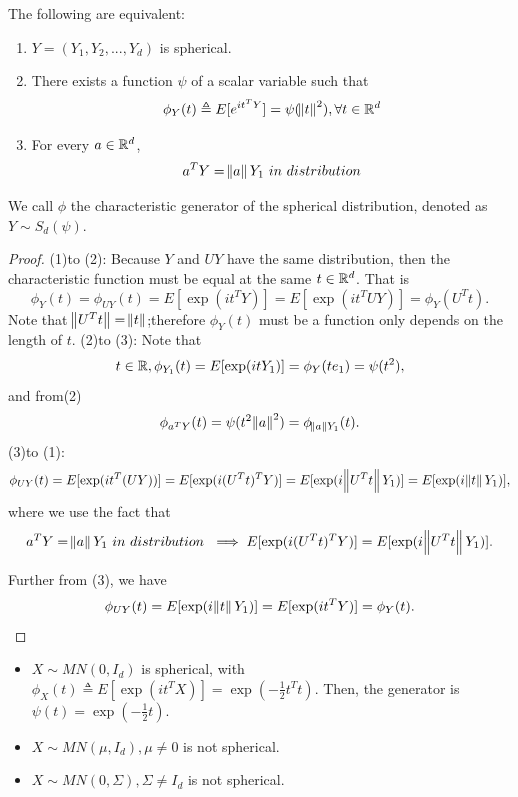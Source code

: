 \begin{refsection}
\begin{lemma}\cite[89]{mcneil2015quantitative}
	The following are equivalent:
	\begin{enumerate}
		\item $Y = (Y_1,Y_2,...,Y_d)$ is spherical.
		\item There exists a function $\psi$ of a scalar variable such that
		$$\phi_{Y}(t) \triangleq E[e^{it^TY}] = \psi(\norm{t}^2),\forall t\in \mathbb{R}^d$$
		\item For every $a\in \mathbb{R}^d$, 
		$$a^TY = \norm{a}Y_1 ~in~distribution$$
	\end{enumerate}
	We call $\phi$ the characteristic generator of the spherical distribution, denoted as $Y\sim S_d(\psi)$.
\end{lemma}
\begin{proof}
	(1)to (2): Because $Y$ and $UY$ have the same distribution, then the characteristic function must be equal at the same $t\in \mathbb{R}^d$. That is
	$$\phi_Y(t) = \phi_{UY}(t) = E[\exp(i t^TY)] = E[\exp(i t^TUY)]=\phi_Y(U^Tt).$$
	Note that $\norm{U^Tt} = \norm{t}$;therefore $\phi_Y(t)$ must be a function only depends on the length of $t$. 
	(2)to (3): Note that$$t\in \mathbb{R},\phi_{Y_1}(t) = E[\exp(itY_1)] = \phi_Y(te_1)= \psi(t^2),$$
	and from(2)
	$$\phi_{a^TY}(t) = \psi(t^2\norm{a}^2) = \phi_{\norm{a}Y_1}(t).$$
	(3)to (1):
	$$\phi_{UY}(t) = E[\exp(i t^T(UY))] = E[\exp(i (U^Tt)^TY)] = E[\exp(i \norm{U^Tt}Y_1)]= E[\exp(i \norm{t}Y_1)],$$
	where we use the fact that $$a^TY = \norm{a}Y_1 ~in~distribution~\implies E[\exp(i (U^Tt)^TY)] = E[\exp(i \norm{U^Tt}Y_1)].$$
	
	Further from (3), we have
	$$\phi_{UY}(t) = E[\exp(i \norm{t}Y_1)] = E[\exp(i t^TY)] = \phi_Y(t).$$
\end{proof}








\begin{example}\hfill
	\begin{itemize}
		\item $X\sim MN(0,I_d)$ is spherical, with $\phi_{X}(t) \triangleq E[\exp(it^TX)] = \exp(-\frac{1}{2}t^Tt).$ Then, the generator is $\psi(t) = \exp(-\frac{1}{2}t)$.
		\item $X\sim MN(\mu,I_d), \mu\neq 0$ is not spherical.
		\item $X\sim MN(0,\Sigma), \Sigma\neq I_d$ is not spherical.
	\end{itemize}
\end{example}


\end{refsection}
